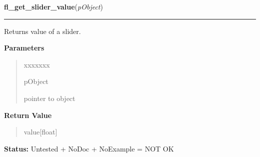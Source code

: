 \hspace{.8\funcindent}\begin{boxedminipage}{\funcwidth}

    \raggedright \textbf{fl\_get\_slider\_value}(\textit{pObject})

    \vspace{-1.5ex}

    \rule{\textwidth}{0.5\fboxrule}
\setlength{\parskip}{2ex}
    Returns value of a slider.

\setlength{\parskip}{1ex}
      \textbf{Parameters}
      \vspace{-1ex}

      \begin{quote}
        \begin{Ventry}{xxxxxxx}

          \item[pObject]

          pointer to object

        \end{Ventry}

      \end{quote}

      \textbf{Return Value}
    \vspace{-1ex}

      \begin{quote}
      value[float]

      \end{quote}

\textbf{Status:} Untested + NoDoc + NoExample = NOT OK



    \end{boxedminipage}

    \label{xformslib:library:fl_set_slider_bounds}

    \vspace{0.5ex}

